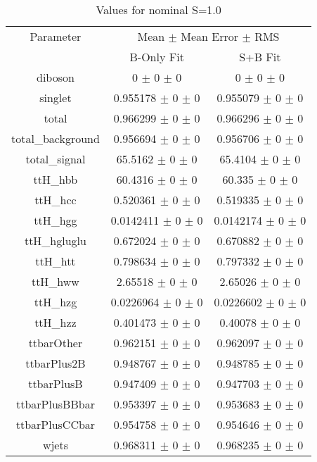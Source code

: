 \begin{table}
\centering
\caption{Values for nominal S=1.0}
\begin{tabular}{ccc}
\toprule
Parameter 	& \multicolumn{2}{c}{Mean $\pm$ Mean Error $\pm$ RMS}\\
 	& B-Only Fit & S+B Fit\\
\midrule
diboson 	& \num{0} $\pm$ \num{0} $\pm$ \num{0} 	& \num{0} $\pm$ \num{0} $\pm$ \num{0}\\
singlet 	& \num{0.955178} $\pm$ \num{0} $\pm$ \num{0} 	& \num{0.955079} $\pm$ \num{0} $\pm$ \num{0}\\
total 	& \num{0.966299} $\pm$ \num{0} $\pm$ \num{0} 	& \num{0.966296} $\pm$ \num{0} $\pm$ \num{0}\\
total\_background 	& \num{0.956694} $\pm$ \num{0} $\pm$ \num{0} 	& \num{0.956706} $\pm$ \num{0} $\pm$ \num{0}\\
total\_signal 	& \num{65.5162} $\pm$ \num{0} $\pm$ \num{0} 	& \num{65.4104} $\pm$ \num{0} $\pm$ \num{0}\\
ttH\_hbb 	& \num{60.4316} $\pm$ \num{0} $\pm$ \num{0} 	& \num{60.335} $\pm$ \num{0} $\pm$ \num{0}\\
ttH\_hcc 	& \num{0.520361} $\pm$ \num{0} $\pm$ \num{0} 	& \num{0.519335} $\pm$ \num{0} $\pm$ \num{0}\\
ttH\_hgg 	& \num{0.0142411} $\pm$ \num{0} $\pm$ \num{0} 	& \num{0.0142174} $\pm$ \num{0} $\pm$ \num{0}\\
ttH\_hgluglu 	& \num{0.672024} $\pm$ \num{0} $\pm$ \num{0} 	& \num{0.670882} $\pm$ \num{0} $\pm$ \num{0}\\
ttH\_htt 	& \num{0.798634} $\pm$ \num{0} $\pm$ \num{0} 	& \num{0.797332} $\pm$ \num{0} $\pm$ \num{0}\\
ttH\_hww 	& \num{2.65518} $\pm$ \num{0} $\pm$ \num{0} 	& \num{2.65026} $\pm$ \num{0} $\pm$ \num{0}\\
ttH\_hzg 	& \num{0.0226964} $\pm$ \num{0} $\pm$ \num{0} 	& \num{0.0226602} $\pm$ \num{0} $\pm$ \num{0}\\
ttH\_hzz 	& \num{0.401473} $\pm$ \num{0} $\pm$ \num{0} 	& \num{0.40078} $\pm$ \num{0} $\pm$ \num{0}\\
ttbarOther 	& \num{0.962151} $\pm$ \num{0} $\pm$ \num{0} 	& \num{0.962097} $\pm$ \num{0} $\pm$ \num{0}\\
ttbarPlus2B 	& \num{0.948767} $\pm$ \num{0} $\pm$ \num{0} 	& \num{0.948785} $\pm$ \num{0} $\pm$ \num{0}\\
ttbarPlusB 	& \num{0.947409} $\pm$ \num{0} $\pm$ \num{0} 	& \num{0.947703} $\pm$ \num{0} $\pm$ \num{0}\\
ttbarPlusBBbar 	& \num{0.953397} $\pm$ \num{0} $\pm$ \num{0} 	& \num{0.953683} $\pm$ \num{0} $\pm$ \num{0}\\
ttbarPlusCCbar 	& \num{0.954758} $\pm$ \num{0} $\pm$ \num{0} 	& \num{0.954646} $\pm$ \num{0} $\pm$ \num{0}\\
wjets 	& \num{0.968311} $\pm$ \num{0} $\pm$ \num{0} 	& \num{0.968235} $\pm$ \num{0} $\pm$ \num{0}\\
\bottomrule
\end{tabular}
\end{table}